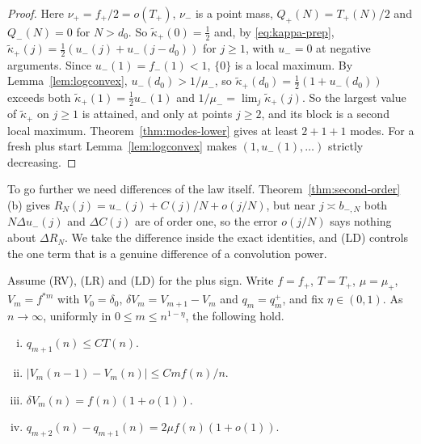 \begin{proof}
Here $\nu_\plus=f_\plus/2=o(T_\plus)$, $\nu_\minus$ is a point mass, $Q_\plus(N)=T_\plus(N)/2$
and $Q_\minus(N)=0$ for $N>d_0$. So $\widetilde\kappa_\plus(0)=\frac12$ and, by
\eqref{eq:kappa-prep}, $\widetilde\kappa_\plus(j)=\frac12(u_\minus(j)+u_\minus(j-d_0))$ for
$j\ge1$, with $u_\minus=0$ at negative arguments. Since $u_\minus(1)=f_\minus(1)<1$,
$\{0\}$ is a local maximum. By Lemma~\ref{lem:logconvex}, $u_\minus(d_0)>1/\mu_\minus$, so
$\widetilde\kappa_\plus(d_0)=\frac12(1+u_\minus(d_0))$ exceeds both
$\widetilde\kappa_\plus(1)=\frac12u_\minus(1)$ and $1/\mu_\minus=\lim_j\widetilde\kappa_\plus(j)$.
So the largest value of $\widetilde\kappa_\plus$ on $j\ge1$ is attained, and only at points
$j\ge2$, and its block is a second local maximum. Theorem~\ref{thm:modes-lower} gives at
least $2+1+1$ modes. For a fresh plus start Lemma~\ref{lem:logconvex} makes
$(1,u_\minus(1),\dots)$ strictly decreasing.
\end{proof}

To go further we need differences of the law itself. Theorem~\ref{thm:second-order}(b) gives
$R_N(j)=u_\minus(j)+C(j)/N+o(j/N)$, but near $j\asymp b_{\minus,N}$ both $N\Delta u_\minus(j)$
and $\Delta C(j)$ are of order one, so the error $o(j/N)$ says nothing about $\Delta R_N$. We
take the difference inside the exact identities, and (LD) controls the one term that is a
genuine difference of a convolution power.

\begin{lemma}\label{lem:plus-diff}
Assume (RV), (LR) and (LD) for the plus sign. Write $f=f_\plus$, $T=T_\plus$,
$\mu=\mu_\plus$, $V_m=f^{*m}$ with $V_0=\delta_0$, $\delta V_m=V_{m+1}-V_m$ and
$q_m=q^\plus_m$, and fix $\eta\in(0,1)$. As $n\to\infty$, uniformly in $0\le m\le n^{1-\eta}$,
the following hold.
\begin{enumerate}[(i)]
\item $q_{m+1}(n)\le CT(n)$.
\item $|V_m(n-1)-V_m(n)|\le Cmf(n)/n$.
\item $\delta V_m(n)=f(n)(1+o(1))$.
\item $q_{m+2}(n)-q_{m+1}(n)=2\mu f(n)(1+o(1))$.
\end{enumerate}
\end{lemma}

